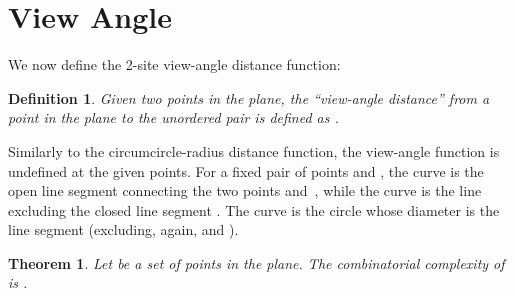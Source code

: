 \documentclass[10pt, conference, compsocconf]{IEEEtran}
\newtheorem{theorem}{Theorem}
\newtheorem{definition}{Definition}
\begin{document}
\section{View Angle}

\label{S-angle}

We now define the 2-site view-angle distance function:
\begin{definition}
   Given two points  in the plane, the ``view-angle distance''
    from a point  in the plane to the unordered pair  is
   defined as .
\end{definition}
Similarly to the circumcircle-radius distance function, the view-angle
function is undefined at the  given points.  For a fixed pair of
points  and , the curve  is the open line
segment connecting the two points  and~, while the curve
 is the line  excluding
the closed line segment .  The curve
 is the circle whose diameter is the line
segment  (excluding, again,  and ).

\begin{theorem}
   Let  be a set of  points in the plane.
   The combinatorial complexity of  is .
\end{theorem}
\end{document}
